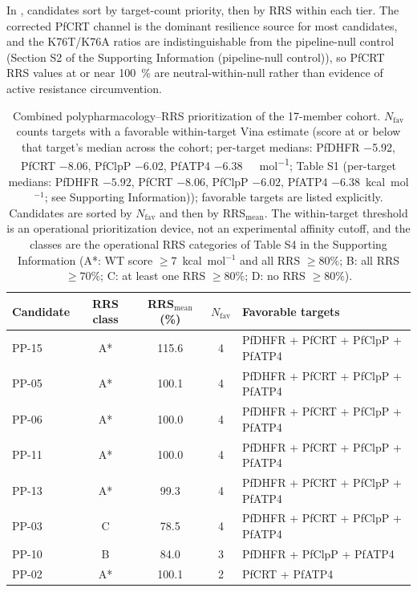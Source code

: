\documentclass[11pt,a4paper]{article}
\begin{document}
	In , candidates sort by target-count priority, then by RRS within each tier. The corrected PfCRT channel is the dominant resilience source for most candidates, and the K76T/K76A ratios are indistinguishable from the pipeline-null control (Section S2 of the Supporting Information (pipeline-null control)), so PfCRT RRS values at or near \qty{100}{\percent} are neutral-within-null rather than evidence of active resistance circumvention.
	
	\begin{table}[ht!]
		\centering
		\caption{Combined polypharmacology--RRS prioritization of the 17-member cohort. $N_{\mathrm{fav}}$ counts targets with a favorable within-target Vina estimate (score at or below that target's median across the cohort; per-target medians: PfDHFR \num{-5.92}, PfCRT \num{-8.06}, PfClpP \num{-6.02}, PfATP4 \qty{-6.38}{\kilo\calorie\per\mol}; Table S1 (per-target medians: PfDHFR $-5.92$, PfCRT $-8.06$, PfClpP $-6.02$, PfATP4 $-6.38$~kcal~mol$^{-1}$; see Supporting Information)); favorable targets are listed explicitly. Candidates are sorted by $N_{\mathrm{fav}}$ and then by RRS$_{\mathrm{mean}}$. The within-target threshold is an operational prioritization device, not an experimental affinity cutoff, and the classes are the operational RRS categories of Table S4 in the Supporting Information (A*: WT score $\geq 7$~kcal~mol$^{-1}$ and all RRS $\geq 80\%$; B: all RRS $\geq 70\%$; C: at least one RRS $\geq 80\%$; D: no RRS $\geq 80\%$).}
		\label{tab:dual_priority}
		\small
		\begin{tabular}{@{}lcccl@{}}
			\toprule
			Candidate & RRS class & RRS$_{\mathrm{mean}}$ (\%) & $N_{\mathrm{fav}}$ & Favorable targets \\
			\midrule
			PP-15 & A* & \num{115.6} & 4 & PfDHFR + PfCRT + PfClpP + PfATP4 \\
			PP-05 & A* & \num{100.1} & 4 & PfDHFR + PfCRT + PfClpP + PfATP4 \\
			PP-06 & A* & \num{100.0} & 4 & PfDHFR + PfCRT + PfClpP + PfATP4 \\
			PP-11 & A* & \num{100.0} & 4 & PfDHFR + PfCRT + PfClpP + PfATP4 \\
			PP-13 & A* & \num{99.3} & 4 & PfDHFR + PfCRT + PfClpP + PfATP4 \\
			PP-03 & C & \num{78.5} & 4 & PfDHFR + PfCRT + PfClpP + PfATP4 \\
			PP-10 & B & \num{84.0} & 3 & PfDHFR + PfClpP + PfATP4 \\
			PP-02 & A* & \num{100.1} & 2 & PfCRT + PfATP4 \\

\end{tabular}
\end{table}
\end{document}
